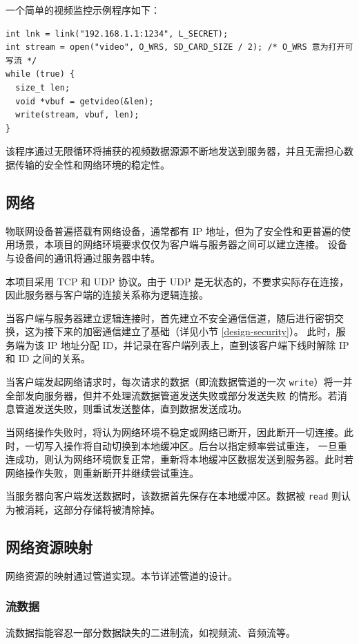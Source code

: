 \documentclass{ctexart}
\begin{document}
一个简单的视频监控示例程序如下：
\begin{verbatim}
int lnk = link("192.168.1.1:1234", L_SECRET);
int stream = open("video", O_WRS, SD_CARD_SIZE / 2); /* O_WRS 意为打开可写流 */
while (true) {
  size_t len;
  void *vbuf = getvideo(&len);
  write(stream, vbuf, len);
}
\end{verbatim}
该程序通过无限循环将捕获的视频数据源源不断地发送到服务器，并且无需担心数据传输的安全性和网络环境的稳定性。

\subsection{网络}
\label{design-network}
物联网设备普遍搭载有网络设备，通常都有 IP 地址，但为了安全性和更普遍的使用场景，本项目的网络环境要求仅仅为客户端与服务器之间可以建立连接。
设备与设备间的通讯将通过服务器中转。

本项目采用 TCP 和 UDP 协议。由于 UDP 是无状态的，不要求实际存在连接，因此服务器与客户端的连接关系称为逻辑连接。

当客户端与服务器建立逻辑连接时，首先建立不安全通信信道，随后进行密钥交换，这为接下来的加密通信建立了基础（详见小节 \ref{design-security}）。
此时，服务端为该 IP 地址分配 ID，并记录在客户端列表上，直到该客户端下线时解除 IP 和 ID 之间的关系。

当客户端发起网络请求时，每次请求的数据（即流数据管道的一次 \verb|write|）将一并全部发向服务器，但并不处理流数据管道发送失败或部分发送失败
的情形。若消息管道发送失败，则重试发送整体，直到数据发送成功。

当网络操作失败时，将认为网络环境不稳定或网络已断开，因此断开一切连接。此时，一切写入操作将自动切换到本地缓冲区。后台以指定频率尝试重连，
一旦重连成功，则认为网络环境恢复正常，重新将本地缓冲区数据发送到服务器。此时若网络操作失败，则重新断开并继续尝试重连。

当服务器向客户端发送数据时，该数据首先保存在本地缓冲区。数据被 \verb|read| 则认为被消耗，这部分存储将被清除掉。

\subsection{网络资源映射}
网络资源的映射通过管道实现。本节详述管道的设计。

\subsubsection{流数据}
\label{design-stream}
流数据指能容忍一部分数据缺失的二进制流，如视频流、音频流等。
\end{document}
